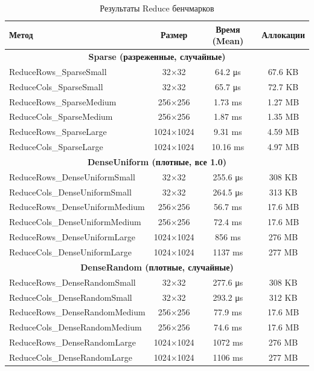 \documentclass[a4paper]{article}
\begin{document}
\begin{table}[H]
\centering
\caption{Результаты Reduce бенчмарков}
\label{tab:reduce}
\begin{tabular}{lccc}
\toprule
Метод & Размер & Время (Mean) & Аллокации \\
\midrule
\multicolumn{4}{c}{\textbf{Sparse (разреженные, случайные)}} \\
\midrule
ReduceRows\_SparseSmall & 32×32 & 64.2 μs & 67.6 KB \\
ReduceCols\_SparseSmall & 32×32 & 65.7 μs & 72.7 KB \\
ReduceRows\_SparseMedium & 256×256 & 1.73 ms & 1.27 MB \\
ReduceCols\_SparseMedium & 256×256 & 1.87 ms & 1.35 MB \\
ReduceRows\_SparseLarge & 1024×1024 & 9.31 ms & 4.59 MB \\
ReduceCols\_SparseLarge & 1024×1024 & 10.16 ms & 4.97 MB \\
\midrule
\multicolumn{4}{c}{\textbf{DenseUniform (плотные, все 1.0)}} \\
\midrule
ReduceRows\_DenseUniformSmall & 32×32 & 255.6 μs & 308 KB \\
ReduceCols\_DenseUniformSmall & 32×32 & 264.5 μs & 313 KB \\
ReduceRows\_DenseUniformMedium & 256×256 & 56.7 ms & 17.6 MB \\
ReduceCols\_DenseUniformMedium & 256×256 & 72.4 ms & 17.6 MB \\
ReduceRows\_DenseUniformLarge & 1024×1024 & 856 ms & 276 MB \\
ReduceCols\_DenseUniformLarge & 1024×1024 & 1137 ms & 277 MB \\
\midrule
\multicolumn{4}{c}{\textbf{DenseRandom (плотные, случайные)}} \\
\midrule
ReduceRows\_DenseRandomSmall & 32×32 & 277.6 μs & 308 KB \\
ReduceCols\_DenseRandomSmall & 32×32 & 293.2 μs & 312 KB \\
ReduceRows\_DenseRandomMedium & 256×256 & 77.9 ms & 17.6 MB \\
ReduceCols\_DenseRandomMedium & 256×256 & 74.6 ms & 17.6 MB \\
ReduceRows\_DenseRandomLarge & 1024×1024 & 1072 ms & 276 MB \\
ReduceCols\_DenseRandomLarge & 1024×1024 & 1106 ms & 277 MB \\
\bottomrule
\end{tabular}
\end{table}
\end{document}

